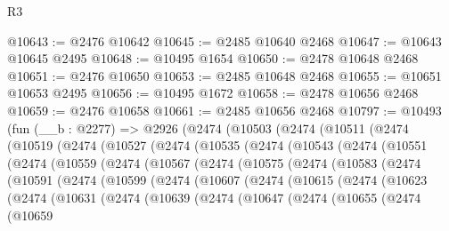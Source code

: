 \begin{lexlean}{R3}
\begin{coremodule}
@10643 := @2476 @10642
@10645 := @2485 @10640 @2468
@10647 := @10643 @10645 @2495
@10648 := @10495 @1654
@10650 := @2478 @10648 @2468
@10651 := @2476 @10650
@10653 := @2485 @10648 @2468
@10655 := @10651 @10653 @2495
@10656 := @10495 @1672
@10658 := @2478 @10656 @2468
@10659 := @2476 @10658
@10661 := @2485 @10656 @2468
@10797 := @10493
    (fun (__b : @2277) =>
    @2926
      (@2474
        (@10503
          (@2474
            (@10511
              (@2474
                (@10519
                  (@2474
                    (@10527
                      (@2474
                        (@10535
                          (@2474
                            (@10543
                              (@2474
                                (@10551
                                  (@2474
                                    (@10559
                                      (@2474
                                        (@10567
                                          (@2474
                                            (@10575
                                              (@2474
                                                (@10583
                                                  (@2474
                                                    (@10591
                                                      (@2474
                                                        (@10599
                                                          (@2474
                                                            (@10607
                                                              (@2474
                                                                (@10615
                                                                  (@2474
                                                                    (@10623
                                                                      (@2474
                                                                        (@10631
                                                                          (@2474
                                                                            (@10639
                                                                              (@2474
                                                                                (@10647
                                                                                  (@2474
                                                                                    (@10655
                                                                                      (@2474
                                                                                        (@10659

\end{coremodule}
\end{lexlean}
